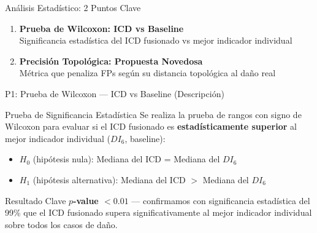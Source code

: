\documentclass{beamer}
\begin{document}
\begin{frame}{Análisis Estadístico: 2 Puntos Clave}
    \centering
    \large
    \vspace{0.5cm}

    \begin{enumerate}
        \setcounter{enumi}{0}
        \item[\textbf{P1}] \textbf{Prueba de Wilcoxon: ICD vs Baseline} \\
        \small Significancia estadística del ICD fusionado vs mejor indicador individual

        \vspace{0.5cm}

        \item[\textbf{P2}] \textbf{Precisión Topológica: Propuesta Novedosa} \\
        \small Métrica que penaliza FPs según su distancia topológica al daño real
    \end{enumerate}
\end{frame}


\begin{frame}{P1: Prueba de Wilcoxon — ICD vs Baseline (Descripción)}
    \small
    \begin{block}{Prueba de Significancia Estadística}
        Se realiza la prueba de rangos con signo de Wilcoxon para evaluar si el ICD fusionado es \textbf{estadísticamente superior} al mejor indicador individual ($DI_6$, baseline):
        \begin{itemize}
            \item $H_0$ (hipótesis nula): Mediana del ICD = Mediana del $DI_6$
            \item $H_1$ (hipótesis alternativa): Mediana del ICD $>$ Mediana del $DI_6$
        \end{itemize}
    \end{block}

    \vspace{0.3cm}

    \begin{block}{Resultado Clave}
        \textbf{$p$-value $< 0.01$} — confirmamos con significancia estadística del 99\% que el ICD fusionado supera significativamente al mejor indicador individual sobre todos los casos de daño.
    \end{block}
\end{frame}
\end{document}
